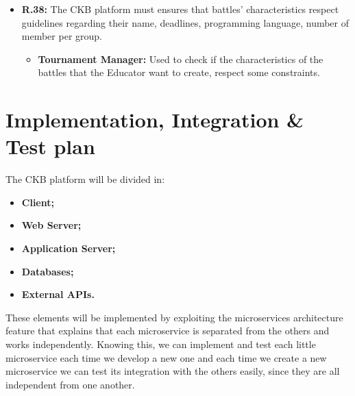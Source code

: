 \documentclass{article}
\begin{document}
{\begin{itemize}
\begin{itemize}
              \item \textbf{Account Manager:} Used to allow Students to access their, or others'
              profile pages and visualize the badges in it.
              \item \textbf{Account Manager:} Used to retrieve Student's data.
          \end{itemize}
    \item \textbf{R.38:} The CKB platform must ensures that battles' characteristics respect guidelines
          regarding their name, deadlines, programming language, number of member per group.
          \begin{itemize}
            \item \textbf{Tournament Manager:} Used to check if the characteristics of the battles
              that the Educator want to create, respect some constraints.
          \end{itemize}
\end{itemize}
\section{Implementation, Integration \& Test plan}
The CKB platform will be divided in:
\begin{itemize}
    \item \textbf{Client;}
    \item \textbf{Web Server;}
    \item \textbf{Application Server;}
    \item \textbf{Databases;}
    \item \textbf{External APIs.}
\end{itemize}
These elements will be implemented by exploiting the microservices architecture feature that explains that each microservice is separated from the others 
and works independently.
Knowing this, we can implement and test each little microservice each time we develop a new one and each time we create a new microservice we
can test its integration with the others easily, since they are all independent from one another.

\newpage
}
\end{document}
